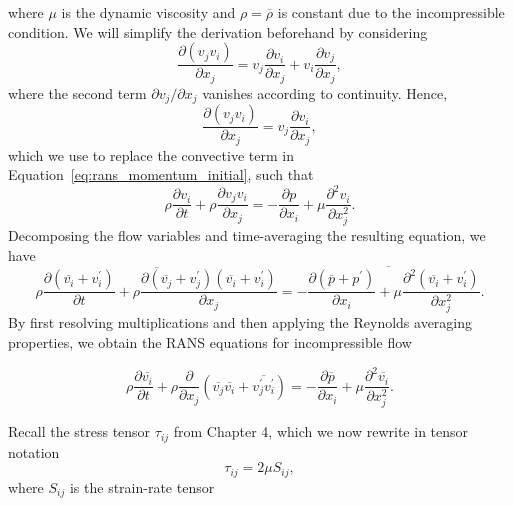 where $\mu$ is the dynamic viscosity and $\rho=\overline{\rho}$ is constant due to the incompressible condition. We will simplify the derivation beforehand by considering
\begin{equation}
    \frac{\partial \left(v_jv_i\right)}{\partial x_j} = v_j \frac{\partial v_i}{\partial x_j} + v_i \frac{\partial v_j}{\partial x_j},
\end{equation}
where the second term $\partial v_j/\partial x_j$ vanishes according to continuity. Hence,
\begin{equation}
    \frac{\partial \left(v_jv_i\right)}{\partial x_j} = v_j \frac{\partial v_i}{\partial x_j},
\end{equation}
which we use to replace the convective term in Equation~\ref{eq:rans_momentum_initial}, such that
\begin{equation}
    \rho\frac{\partial  v_i}{\partial t} + \rho\frac{\partial  v_j v_i}{\partial x_j} =
    - \frac{\partial p}{\partial x_i} + \mu \frac{\partial^2 v_i}{\partial x_j^2}.
\end{equation}
Decomposing the flow variables and time-averaging the resulting equation, we have
\begin{equation}
    \overline{ 
    \rho\frac{\partial  \left(\overline{v_i}+v_i^\prime\right)}{\partial t} 
    + \rho \frac{\partial  \left(\overline{v_j} + v_j^\prime\right)\left(\overline{v_i}+ v_i^\prime\right)}{\partial x_j}} = \overline{
     - \frac{\partial \left(\overline{p}+p^\prime\right)}{\partial x_i} 
    + \mu \frac{\partial^2 \left(\overline{v_i}
    +v_i^\prime\right)}{\partial x_j^2}}.
\end{equation}
By first resolving multiplications and then applying the Reynolds averaging properties, we obtain the RANS equations for incompressible flow
\begin{eqBox}
\begin{equation}
    \rho \frac{\partial \overline{v_i}}{\partial t} 
    + \rho  \frac{\partial}{\partial x_j} \left(\overline{v_j}\overline{v_i} + \overline{v_j^\prime v_i^\prime}\right)
    =- \frac{\partial \overline{p}}{\partial x_i} 
    + \mu \frac{\partial^2 \overline{v_i}}{\partial x_j^2}.
\end{equation}
\end{eqBox}
Recall the stress tensor $\tau_{ij}$ from Chapter 4, which we now rewrite in tensor notation
\begin{equation}
    \tau_{ij} = 2\mu S_{ij},
\end{equation}
where $S_{ij}$ is the strain-rate tensor
